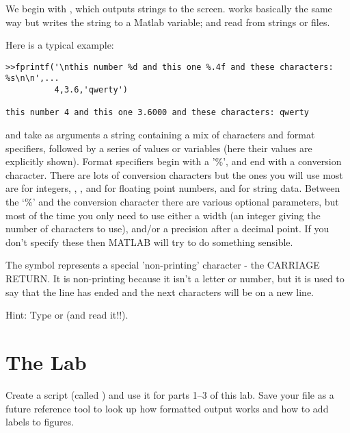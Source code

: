 \documentclass[letterpaper]{article}
\begin{document}
We begin with , which outputs strings  to the screen.  works basically
the same way but writes the string to a Matlab variable;   and  
read from strings or files. 

Here is a typical example:
\begin{lstlisting}
>>fprintf('\nthis number %d and this one %.4f and these characters: %s\n\n',...
          4,3.6,'qwerty')
 
this number 4 and this one 3.6000 and these characters: qwerty
\end{lstlisting}

 and  take as arguments a string containing a mix of characters 
and format specifiers,
followed by a series of values or variables (here their values are explicitly shown). Format
specifiers begin with a '\%', and end with a conversion character. There are lots of
conversion characters but the ones you will use most are  for integers, , , and  
for floating
point numbers, and  for string data. Between the `\%' and the conversion character there are various optional
parameters, but most of the time you only need to use either a width (an integer giving the
number of characters to use), and/or
a precision after a decimal point. If you don't specify
these then MATLAB will try to do something sensible.


The \mcode{\\n} symbol represents a special 'non-printing' character - the CARRIAGE RETURN. It
is non-printing because it isn't a letter or number, but it is used to say that the line 
has ended and the next characters
will be on a new line.

Hint:  Type  or  (and read it!!).

\section{The Lab}


Create a script (called ) and use it for parts 1--3 of this lab.  
Save your  file as a future reference tool to look up how formatted output works
and how to add labels to figures.
\end{document}
